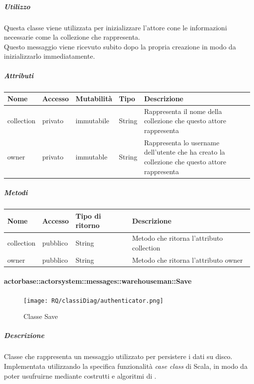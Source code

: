 \documentclass{scalatekids-article}
\begin{document}
\subparagraph{Utilizzo}
Questa classe viene utilizzata per inizializzare l'attore cone le informazioni
necessarie come la collezione che rappresenta.\\Questo messaggio viene
ricevuto subito dopo la propria creazione in modo da inizializzarlo immediatamente.

\subparagraph{Attributi}
\begin{tabular}{| p{2cm} | p{1.5cm} | p{2cm} | p{3cm} | p{8.5cm} |}
  \hline
  Nome & Accesso & Mutabilità & Tipo & Descrizione\\
  \hline
  collection & privato & immutabile & String & Rappresenta il nome della collezione che questo attore rappresenta\\
  \hline
  owner & privato & immutable & String & Rappresenta lo username dell'utente che ha creato la collezione che questo attore rappresenta\\
  \hline
\end{tabular}

\subparagraph{Metodi}
\begin{tabular}{| l | l | l | l |}
  \hline
  Nome & Accesso & Tipo di ritorno & Descrizione\\
  \hline
  collection & pubblico & String & Metodo che ritorna l'attributo collection\\
  \hline
  owner & pubblico & String & Metodo che ritorna l'attributo owner\\
  \hline
\end{tabular}

\paragraph{actorbase::actorsystem::messages::warehouseman::Save}
\label{sec:actorbase::actorsystem::messages::warehouseman::Save}

\begin{figure}[H]
  \begin{center}
    \texttt{[image: RQ/classiDiag/authenticator.png]}
    \caption{Classe Save}
  \end{center}
\end{figure}

\subparagraph{Descrizione}
Classe che rappresenta un messaggio utilizzato per persistere i dati su disco.\\Implementata utilizzando la specifica funzionalità \textit{case class} di Scala,
in modo da poter usufruirne mediante costrutti e algoritmi di
.
\end{document}
